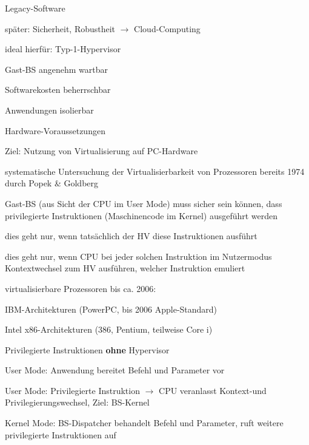 \documentclass[a4paper]{article}
\newcommand{\cmark}{\ding{51}}
\newcommand{\xmark}{\ding{55}}
\begin{document}
\begin{multicols}{3}
\begin{itemize*}
\begin{itemize*}
\begin{enumerate*}
                \item Legacy-Software
            \end{enumerate*}
            \item später: Sicherheit, Robustheit $\rightarrow$ Cloud-Computing
        \end{itemize*}
        \item ideal hierfür: Typ-1-Hypervisor
        \begin{itemize*}
            \item[\cmark] Gast-BS angenehm wartbar
            \item[\cmark] Softwarekosten beherrschbar
            \item[\cmark] Anwendungen isolierbar
        \end{itemize*}
    \end{itemize*}

    Hardware-Voraussetzungen
    \begin{itemize*}
        \item Ziel: Nutzung von Virtualisierung auf PC-Hardware
        \item systematische Untersuchung der Virtualisierbarkeit von Prozessoren bereits 1974 durch Popek \& Goldberg
        \begin{itemize*}
            \item Gast-BS (aus Sicht der CPU im User Mode) muss sicher sein können, dass privilegierte Instruktionen (Maschinencode im Kernel) ausgeführt werden
            \item dies geht nur, wenn tatsächlich der HV diese Instruktionen ausführt
            \item dies geht nur, wenn CPU bei jeder solchen Instruktion im Nutzermodus Kontextwechsel zum HV ausführen, welcher Instruktion emuliert
        \end{itemize*}
        \item virtualisierbare Prozessoren bis ca. 2006:
        \begin{itemize*}
            \item[\cmark] IBM-Architekturen (PowerPC, bis 2006 Apple-Standard)
            \item[\xmark] Intel x86-Architekturen (386, Pentium, teilweise Core i)
        \end{itemize*}
    \end{itemize*}

    Privilegierte Instruktionen \textbf{ohne} Hypervisor
    \begin{enumerate*}
        \item User Mode: Anwendung bereitet Befehl und Parameter vor
        \item User Mode: Privilegierte Instruktion $\rightarrow$ CPU veranlasst Kontext-und Privilegierungswechsel, Ziel: BS-Kernel
        \item Kernel Mode: BS-Dispatcher behandelt Befehl und Parameter, ruft weitere privilegierte Instruktionen auf
    \end{enumerate*}


\end{multicols}
\end{document}
